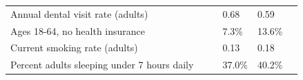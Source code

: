 \documentclass[9pt]{report}
\begin{document}
\begin{tabular}{p{.10in}p{.10in}p{.10in}p{3.7in}>{\hfill}p{.85in}>{\hfill}p{.85in}>{\hfill}p{.85in}>{\hfill}p{.85in}p{0.1in}}
\multicolumn{4}{l}{\parbox{3.6in}{\strut\raggedright{{Annual dental visit rate (adults)}}\strut}} &  &  & 0.68 & 0.59 & \multicolumn{1}{l}{}  \\ 
\multicolumn{4}{l}{\parbox{3.6in}{\strut\raggedright{{Ages 18-64, no health insurance}}\strut}} &  &  & 7.3\% & 13.6\% & \multicolumn{1}{l}{}  \\ 
\multicolumn{4}{l}{\parbox{3.6in}{\strut\raggedright{{Current smoking rate (adults)}}\strut}} &  &  & 0.13 & 0.18 & \multicolumn{1}{l}{}  \\ 
\multicolumn{4}{l}{\parbox{3.6in}{\strut\raggedright{{Percent adults sleeping under 7 hours daily}}\strut}} &  &  & 37.0\% & 40.2\% & \multicolumn{1}{l}{}  \\ 

\end{tabular}
\setlength{\tabcolsep}{6pt} %


\vspace{36pt}
\linespread{1.5}
\theendnotes
\end{document}
